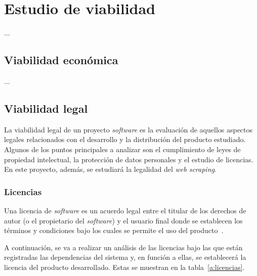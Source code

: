 \section{Estudio de viabilidad}

...

\subsection{Viabilidad económica}

...

\subsection{Viabilidad legal}

La viabilidad legal de un proyecto \textit{software} es la evaluación de aquellos aspectos legales relacionados con el desarrollo y la distribución del producto estudiado. Algunos de los puntos principales a analizar son el cumplimiento de leyes de propiedad intelectual, la protección de datos personales y el estudio de licencias. En este proyecto, además, se estudiará la legalidad del \textit{web scraping}.

\subsubsection{Licencias}

Una licencia de \textit{software} es un acuerdo legal entre el titular de los derechos de autor (o el propietario del \textit{software}) y el usuario final donde se establecen los términos y condiciones bajo los cuales se permite el uso del producto~\cite{licenciaQueEs}.

A continuación, se va a realizar un análisis de las licencias bajo las que están registradas las dependencias del sistema y, en función a ellas, se establecerá la licencia del producto desarrollado. Estas se muestran en la tabla~\ref{a:licencias}.


